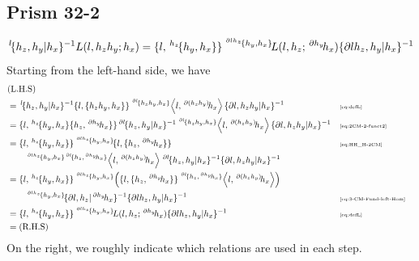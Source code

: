 \documentclass[11pt, reqno]{amsart} %
\newcommand{\act}[1]{\,\sp{#1}\!}
\theoremstyle{definition}
\theoremstyle{remark}
\numberwithin{equation}{section}
\begin{document}
\subsection{Prism 32-2}
\[
  \act{l}\{h_z,h_y|h_x\}^{-1}L(l,h_zh_y;h_x) = \{l,\act{h_z}\{h_y,h_x\}\}\act{\act{\partial lh_z}\{h_y,h_x\}}L(l,h_z;\act{\partial h_y}h_x)\{\partial lh_z,h_y|h_x\}^{-1}
\]
Starting from the left-hand side, we have
\begin{align*}
  &(\text{L.H.S}) \\
  &= 
  \act{l}\{h_z,h_y|h_x\}^{-1}\{l,\{h_zh_y,h_x\}\}\act{\act{\partial l}\{h_zh_y,h_x\}}\left<l,\act{\partial (h_zh_y)}h_x\right>\{\partial l,h_zh_y|h_x\}^{-1}
  & &\text{\tiny \eqref{eq:defL}} \\
  &= \{l,\act{h_z}\{h_y,h_x\}\{h_z,\act{\partial h_y}h_x\}\}\act{\partial l}\{h_z,h_y|h_x\}^{-1}\act{\act{\partial l}\{h_zh_y,h_x\}}\left<l,\act{\partial (h_zh_y)}h_x\right>\{\partial l,h_zh_y|h_x\}^{-1}
  & &\text{\tiny \eqref{eq:2CM-2-funct2}} \\
  &= \{l,\act{h_z}\{h_y,h_x\}\}\act{\act{\partial lh_z}\{h_y,h_x\}}\{l,\{h_z,\act{\partial h_y}h_x\}\} & &\text{\tiny \eqref{eq:HH_H-2CM}} \\
  &\qquad \act{\act{\partial lh_z}\{h_y,h_x\}\act{\partial l}\{h_z,\act{\partial h_y}h_x\}}\left<l,\act{\partial (h_zh_y)}h_x\right>\act{\partial l}\{h_z,h_y|h_x\}^{-1}\{\partial l,h_zh_y|h_x\}^{-1} & &\text{\tiny } \\
  &= \{l,\act{h_z}\{h_y,h_x\}\}\act{\act{\partial lh_z}\{h_y,h_x\}}\left(\{l,\{h_z,\act{\partial h_y}h_x\}\}\act{\act{\partial l}\{h_z,\act{\partial h_y}h_x\}}\left<l,\act{\partial (h_zh_y)}h_x\right>\right) \\
  &\qquad \act{\act{\partial lh_z}\{h_y,h_x\}}\{\partial l,h_z|\act{\partial h_y}h_x\}^{-1}\{\partial lh_z,h_y|h_x\}^{-1}& &\text{\tiny \eqref{eq:3-CM-Fund-left-Hom}} \\
  &= \{l,\act{h_z}\{h_y,h_x\}\}\act{\act{\partial lh_z}\{h_y,h_x\}}L(l,h_z;\act{\partial h_y}h_x)\{\partial lh_z,h_y|h_x\}^{-1} & &\text{\tiny \eqref{eq:defL}} \\
  &= (\text{R.H.S})
\end{align*}
On the right, we roughly indicate which relations are used in each step.
\end{document}
